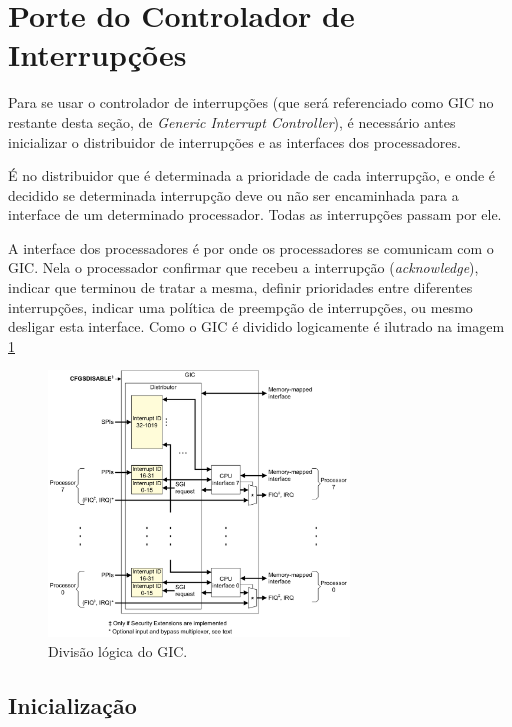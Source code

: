 \documentclass{ufscThesis/ufscThesis} %
\begin{document}
\section{Porte do Controlador de Interrupções}


Para se usar o controlador de interrupções (que será referenciado como GIC no restante desta seção, de \emph{Generic Interrupt Controller}), é necessário antes inicializar o distribuidor de interrupções e as interfaces dos processadores.

É no distribuidor que é determinada a prioridade de cada interrupção, e onde é decidido se determinada interrupção deve ou não ser encaminhada para a interface de um determinado processador. Todas as interrupções passam por ele.

A interface dos processadores é por onde os processadores se comunicam com o GIC. Nela o processador confirmar que recebeu a interrupção (\emph{acknowledge}), indicar que terminou de tratar a mesma, definir prioridades entre diferentes interrupções, indicar uma política de preempção de interrupções, ou mesmo desligar esta interface. Como o GIC é dividido logicamente é ilutrado na imagem \ref{img:gic}

\begin{figure}[ht!]
    \centering
    \includegraphics[width=8cm]{figuras/gic}
    \caption{Divisão lógica do GIC.}
    \label{img:gic}
\end{figure}

\subsection{Inicialização}
\end{document}
